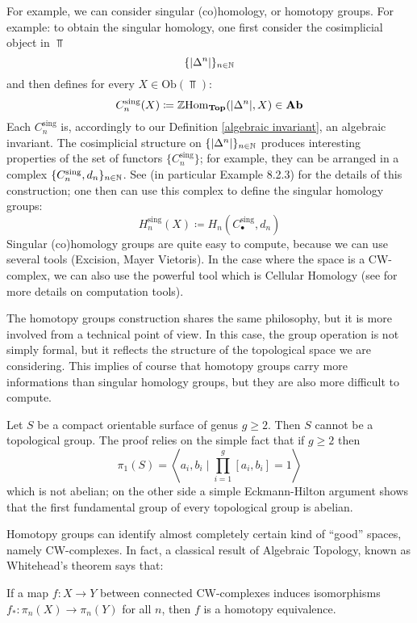 \begin{refsection}
For example, we can consider singular (co)homology, or homotopy groups. For example: to obtain the singular homology, one first consider the cosimplicial object in $\Top$
\[
\{|\Delta^n|\}_{n \in \mathbb{N}}
\]
and then defines for every $X \in \mathrm{Ob}(\Top)$:
\[
C_n^{\mathrm{sing}}(X) \coloneqq \mathbb{Z} \mathrm{Hom}_{\mathbf{Top}}(|\Delta^n|,X) \in \mathbf{Ab}
\]
Each $C_n^{\mathrm{sing}}$ is, accordingly to our Definition \ref{algebraic invariant}, an algebraic invariant. The cosimplicial structure on $\{|\Delta^n|\}_{n \in \mathbb{N}}$ produces interesting properties of the set of functors $\{C_n^{\mathrm{sing}}\}$; for example, they can be arranged in a complex $\{C_n^{\mathrm{sing}},d_n\}_{n \in \mathbb{N}}$. See \cite[Ch. 8.2]{weibel} (in particular Example 8.2.3) for the details of this construction; one then can use this complex to define the singular homology groups:
\[
H_n^{\mathrm{sing}}(X)\coloneqq H_n(C_\bullet^{\mathrm{sing}},d_n)
\]
Singular (co)homology groups are quite easy to compute, because we can use several tools (Excision, Mayer Vietoris). In the case where the space is a CW-complex, we can also use the powerful tool which is Cellular Homology (see \cite[Ch. 2.2]{hatcher} for more details on computation tools).

The homotopy groups construction shares the same philosophy, but it is more involved from a technical point of view. In this case, the group operation is not simply formal, but it reflects the structure of the topological space we are considering. This implies of course that homotopy groups carry more informations than singular homology groups, but they are also more difficult to compute.

\begin{eg}
Let $S$ be a compact orientable surface of genus $g \ge 2$. Then $S$ cannot be a topological group. The proof relies on the simple fact that if $g \ge 2$ then
\[
\pi_1(S) = \left\langle a_i,b_i \mid \prod_{i = 1}^g [a_i,b_i] = 1 \right\rangle
\]
which is not abelian; on the other side a simple Eckmann-Hilton argument shows that the first fundamental group of every topological group is abelian.
\end{eg}

Homotopy groups can identify almost completely certain kind of ``good'' spaces, namely CW-complexes. In fact, a classical result of Algebraic Topology, known as Whitehead's theorem says that:

\begin{thm} \label{thm concrete whitehead}
If a map $f \colon X \to Y$ between connected CW-complexes induces isomorphisms $f_* \colon \pi_n(X) \to \pi_n(Y)$ for all $n$, then $f$ is a homotopy equivalence.
\end{thm}


\end{refsection}
